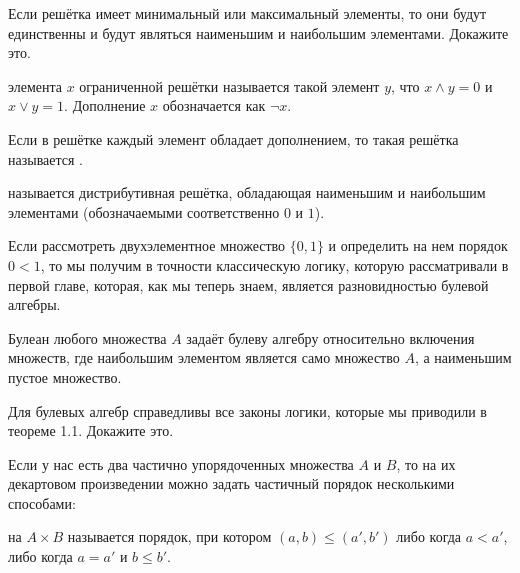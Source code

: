 \begin{exercise}
Если решётка имеет минимальный или максимальный элементы, то они будут единственны и будут являться наименьшим и наибольшим элементами. Докажите это.
\end{exercise}

\begin{definition}
 элемента $x$ ограниченной решётки называется такой элемент $y$, что $x\wedge y = 0$ и $x \vee y = 1$. Дополнение $x$ обозначается как $\neg x$.
\end{definition}

\begin{definition}
Если в решётке каждый элемент обладает дополнением, то такая решётка называется .
\end{definition}

\begin{definition}
 называется дистрибутивная решётка, обладающая наименьшим и наибольшим элементами (обозначаемыми соответственно $0$ и $1$).
\end{definition}

\begin{example}
Если рассмотреть двухэлементное множество $\{0, 1\}$ и определить на нем порядок $0 < 1$, то мы получим в точности классическую логику, которую рассматривали в первой главе, которая, как мы теперь знаем, является разновидностью булевой алгебры.
\end{example}

\begin{example}
Булеан любого множества $A$ задаёт булеву алгебру относительно включения множеств, где наибольшим элементом является само множество $A$, а наименьшим пустое множество.
\end{example}

\begin{exercise}
Для булевых алгебр справедливы все законы логики, которые мы приводили в теореме 1.1. Докажите это.
\end{exercise}

Если у нас есть два частично упорядоченных множества $A$ и $B$, то на их декартовом произведении можно задать частичный порядок несколькими способами:

\begin{definition}
 на $A\times B$ называется порядок, при котором $(a, b) \le (a', b')$ либо когда $a < a'$, либо когда $a=a'$ и $b\le b'$.
\end{definition}


